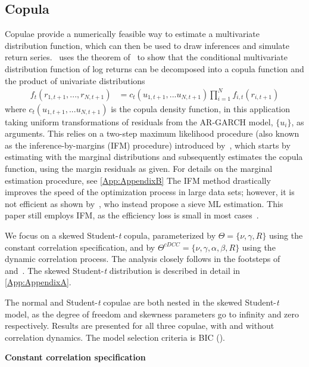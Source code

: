 \subsection{Copula}
Copulae provide a numerically feasible way to estimate a multivariate distribution function, which can then be used to draw inferences and simulate return series.~\textcite{Patton2006} uses the theorem of~\textcite{Sklar1959} to show that the conditional multivariate distribution function of log returns can be decomposed into a copula function and the product of univariate distributions
\begin{align} \label{eq:sklar}
    f_t(r_{1,t+1}, ..., r_{N, t+1}) &= c_t(u_{1, t+1}, ... u_{N, t+1}) \prod^N_{i=1} f_{i,t}(r_{i, t+1})
\end{align}
where $c_t(u_{1, t+1}, ... u_{N, t+1})$ is the copula density function, in this application taking uniform transformations of residuals from the AR-GARCH model, $\{u_i\}$, as arguments. This relies on a two-step maximum likelihood procedure (also known as the inference-by-margins (IFM) procedure) introduced by~\textcite{Joe1997}, which starts by estimating with the marginal distributions and subsequently estimates the copula function, using the margin residuals as given. For details on the marginal estimation procedure, see \autoref{App:AppendixB} The IFM method drastically improves the speed of the optimization process in large data sets; however, it is not efficient as shown by~\textcite{ChenFanTsyrennikov2006}, who instead propose a sieve ML estimation. This paper still employs IFM, as the efficiency loss is small in most cases~\autocite{Patton2006}. 

We focus on a skewed Student-\textit{t} copula, parameterized by $\Theta = \{\nu, \gamma, R\}$ using the constant correlation specification, and by $\Theta^{cDCC} = \{\nu, \gamma, \alpha, \beta, R\}$ using the dynamic correlation process. The analysis closely follows in the footsteps of~\textcite{Aielli2013} and~\textcite{ChristoffersenErrunzaJacobLanglois2012}. The skewed Student-\textit{t} distribution is described in detail in \autoref{App:AppendixA}.

The normal and Student-\textit{t} copulae are both nested in the skewed Student-\textit{t} model, as the degree of freedom and skewness parameters go to infinity and zero respectively. Results are presented for all three copulae, with and without correlation dynamics. The model selection criteria is BIC (\textcite{Schwarz1978}).

\textbf{Constant correlation specification}

